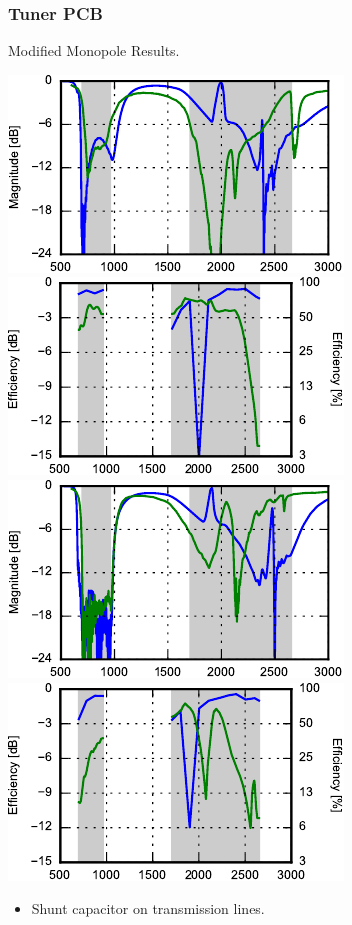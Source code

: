 \begin{frame}
  \frametitle{Tuner PCB}
    \begin{block}{Modified Monopole Results.}
\begin{center}
    \includegraphics{img/Lasse/tuner_pcb/002_s11top.pdf}
    \includegraphics{img/Lasse/tuner_pcb/002_efftop.pdf} \\
    \includegraphics{img/Lasse/tuner_pcb/002_s22side.pdf}
    \includegraphics{img/Lasse/tuner_pcb/002_effside.pdf}
\end{center}
      \begin{itemize}
      \item Shunt capacitor on transmission lines.
      \end{itemize}
    \end{block}
\end{frame}

